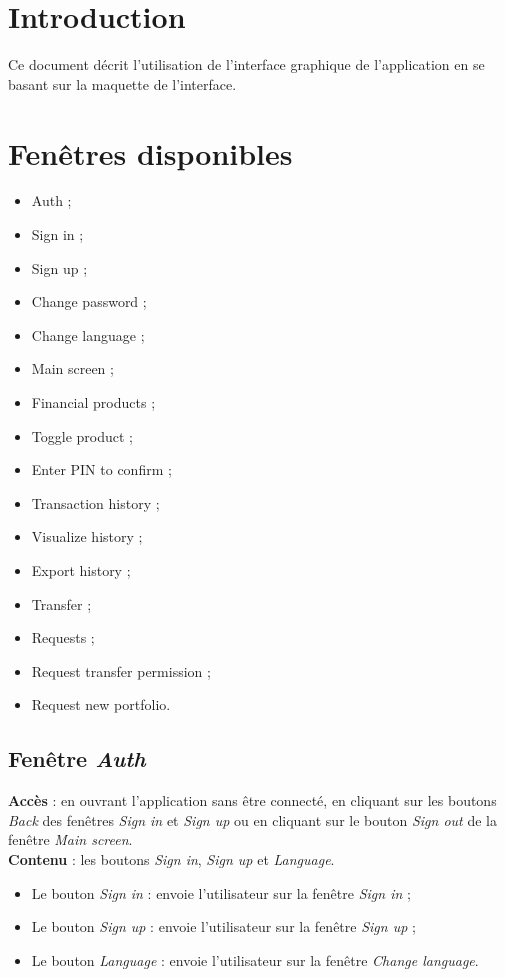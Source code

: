 \documentclass{article}
\newcommand{\navbutton}[2]{Le bouton \emph{#1} : envoie l'utilisateur sur la fenêtre \emph{#2}}
\newcommand{\access}[1]{ \noindent\textbf{Accès} : #1 \\}
\newcommand{\content}[1]{\textbf{Contenu} : #1}
\begin{document}
\section{Introduction}
\noindent
Ce document décrit l'utilisation de l'interface graphique de l'application en se basant sur la maquette de l'interface. \\

\section{Fenêtres disponibles}
\begin{itemize}
\item Auth ;
\item Sign in ;
\item Sign up ;
\item Change password ;
\item Change language ;
\item Main screen ;
\item Financial products ;
\item Toggle product ;
\item Enter PIN to confirm ;
\item Transaction history ;
\item Visualize history ;
\item Export history ;
\item Transfer ;
\item Requests ;
\item Request transfer permission ;
\item Request new portfolio.
\end{itemize}


\subsection{Fenêtre \emph{Auth}}
\access{en ouvrant l'application sans être connecté, en cliquant sur les boutons \emph{Back} des fenêtres \emph{Sign in} et \emph{Sign up} ou en cliquant sur le bouton \emph{Sign out} de la fenêtre \emph{Main screen}.}
\content{les boutons \emph{Sign in}, \emph{Sign up} et \emph{Language}.}
\begin{itemize}
\item \navbutton{Sign in}{Sign in} ;
\item \navbutton{Sign up}{Sign up} ;
\item \navbutton{Language}{Change language}.
\end{itemize}
\end{document}
